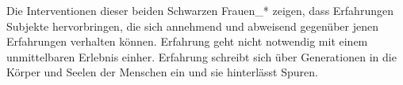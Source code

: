 Die Interventionen dieser beiden Schwarzen Frauen\_* zeigen, dass Erfahrungen
Subjekte hervorbringen, die sich annehmend und abweisend gegenüber jenen
Erfahrungen verhalten können. Erfahrung geht nicht notwendig mit einem
unmittelbaren Erlebnis einher. Erfahrung schreibt sich über Generationen in die
Körper und Seelen der Menschen ein und sie hinterlässt Spuren.
